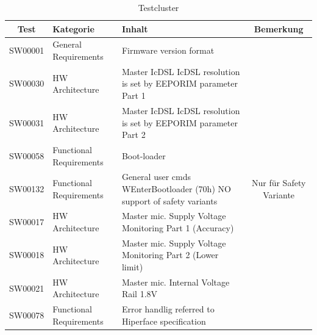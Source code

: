 \begin{table}[h]
\begin{center}
\begin{tabularx}{\textwidth}{|c|X|X|c|}
\hline
\rowcolor[gray]{0.6}
Test & Kategorie & Inhalt & Bemerkung \\
\hline
\rowcolor{cyan}
SW00001 &General Requirements & Firmware version format &  \\
\hline
\rowcolor{cyan}
SW00030 &HW Architecture & Master IcDSL IcDSL resolution is set by EEPORIM parameter Part 1 & \\
\hline
\rowcolor{cyan}
SW00031 &HW Architecture & Master IcDSL IcDSL resolution is set by EEPORIM parameter Part 2 &   \\
\hline
\rowcolor{cyan}
SW00058 &Functional Requirements & Boot-loader &  \\
\hline
\rowcolor{cyan}
SW00132 &Functional Requirements & General user cmds WEnterBootloader (70h) NO support of safety variants &  Nur für Safety Variante
\\
\hline
\rowcolor{red}
SW00017 &HW Architecture & Master mic. Supply Voltage Monitoring Part 1 (Accuracy) &  \\
\hline
\rowcolor{red}
SW00018 &HW Architecture & Master mic. Supply Voltage Monitoring Part 2 (Lower limit)
 &  \\
\hline
\rowcolor{red}
SW00021 &HW Architecture & Master mic. Internal Voltage Rail 1.8V
 &  \\
\hline
\rowcolor{green}
SW00078 &Functional Requirements & Error handlig referred to Hiperface specification 
 &  \\
\hline

\end{tabularx}
\end{center}
\caption{Testcluster \label{tab:Testcluster}}
\end{table}
\cleardoublepage


